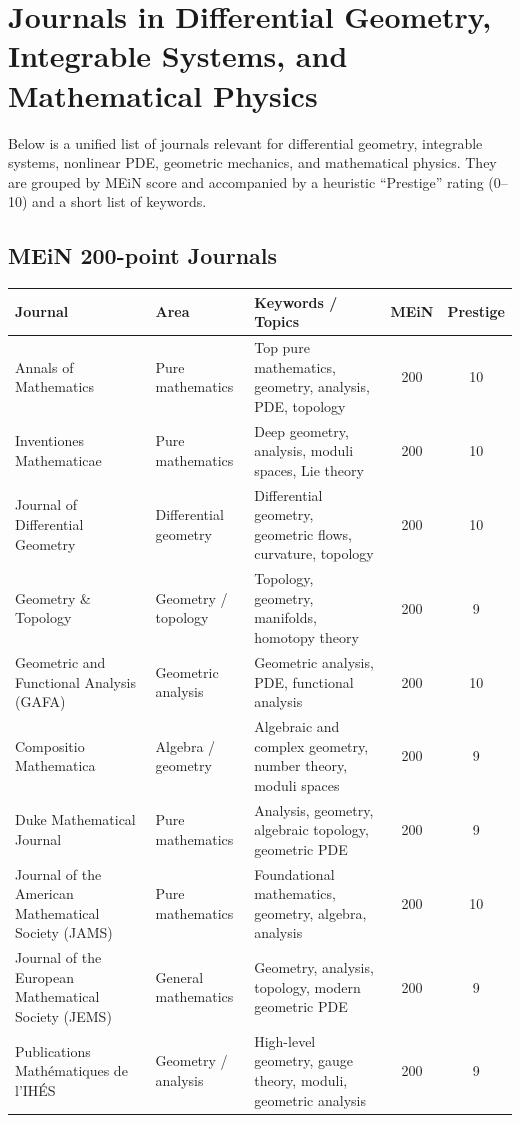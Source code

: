 \documentclass[11pt]{article}
\begin{document}

\section*{Journals in Differential Geometry, Integrable Systems, and Mathematical Physics}

Below is a unified list of journals relevant for differential geometry,
integrable systems, nonlinear PDE, geometric mechanics, and mathematical physics.
They are grouped by MEiN score and accompanied by a heuristic ``Prestige''
rating (0--10) and a short list of keywords.

\subsection*{MEiN 200-point Journals}

\begin{longtable}{p{4.6cm} p{3.6cm} p{4.8cm} c c}
\toprule
\textbf{Journal} & \textbf{Area} & \textbf{Keywords / Topics} & \textbf{MEiN} & \textbf{Prestige} \\
\midrule
Annals of Mathematics &
Pure mathematics &
Top pure mathematics, geometry, analysis, PDE, topology &
200 & 10 \\
Inventiones Mathematicae &
Pure mathematics &
Deep geometry, analysis, moduli spaces, Lie theory &
200 & 10 \\
Journal of Differential Geometry &
Differential geometry &
Differential geometry, geometric flows, curvature, topology &
200 & 10 \\
Geometry \& Topology &
Geometry / topology &
Topology, geometry, manifolds, homotopy theory &
200 & 9 \\
Geometric and Functional Analysis (GAFA) &
Geometric analysis &
Geometric analysis, PDE, functional analysis &
200 & 10 \\
Compositio Mathematica &
Algebra / geometry &
Algebraic and complex geometry, number theory, moduli spaces &
200 & 9 \\
Duke Mathematical Journal &
Pure mathematics &
Analysis, geometry, algebraic topology, geometric PDE &
200 & 9 \\
Journal of the American Mathematical Society (JAMS) &
Pure mathematics &
Foundational mathematics, geometry, algebra, analysis &
200 & 10 \\
Journal of the European Mathematical Society (JEMS) &
General mathematics &
Geometry, analysis, topology, modern geometric PDE &
200 & 9 \\
Publications Math\'ematiques de l'IH\'ES &
Geometry / analysis &
High-level geometry, gauge theory, moduli, geometric analysis &
200 & 9 \\
\bottomrule
\end{longtable}
\end{document}
